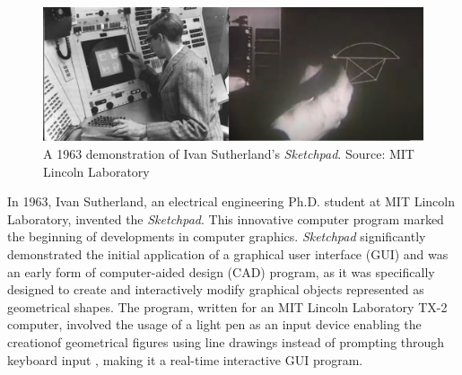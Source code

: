 \documentclass[conference]{IEEEtran}
\begin{document}
\begin{figure}[htb!]
    \centering
    \includegraphics[width=1\linewidth]{sketchpad1.png}
    \caption{A 1963 demonstration of Ivan Sutherland's \textit{Sketchpad}. Source: MIT Lincoln Laboratory}
\end{figure}
In 1963, Ivan Sutherland, an electrical engineering Ph.D. student at MIT Lincoln Laboratory, invented the \textit{Sketchpad}. This innovative computer program marked the beginning of developments in computer graphics\cite{hci}\cite{acm}. \textit{Sketchpad} significantly demonstrated the initial application of a graphical user interface (GUI) and was an early form of computer-aided design (CAD) program, as it was specifically designed to create and interactively modify graphical objects represented as geometrical shapes. The program, written for an MIT Lincoln Laboratory TX-2 computer, involved the usage of a light pen as an input device enabling the creationof geometrical figures using line drawings instead of prompting through keyboard input \cite{sutherland}, making it a real-time interactive GUI program.
\end{document}
